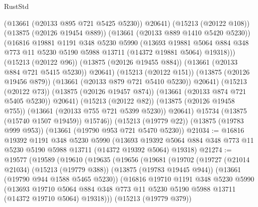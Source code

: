 \begin{lexlean}{RustStd}
\begin{coremodule}
                    (@13661 (@20133 @895 @721 @5425 @5230))
                    @20641)
                  (@15213 (@20122 @108))
                  (@13875 (@20126 @19454 @889))
                  (@13661 (@20133 @889 @1410 @5420 @5230))
                  (@16816
                    @19881
                    @1191
                    @348
                    @5230
                    @5990
                    (@13693
                      @19881
                      @5064
                      @884
                      @348
                      @773
                      @11
                      @5230
                      @5190
                      @5988
                      @13711
                      (@14372 @19881 @5064)
                      @19318)))
                (@15213 (@20122 @96))
                (@13875 (@20126 @19455 @884))
                (@13661 (@20133 @884 @721 @5415 @5230))
                @20641)
              (@15213 (@20122 @151))
              (@13875 (@20126 @19456 @879))
              (@13661 (@20133 @879 @721 @5410 @5230))
              @20641)
            (@15213 (@20122 @73))
            (@13875 (@20126 @19457 @874))
            (@13661 (@20133 @874 @721 @5405 @5230))
            @20641)
          (@15213 (@20122 @82))
          (@13875 (@20126 @19458 @755))
          (@13661 (@20133 @755 @721 @5399 @5230))
          @20641)
        @15734
        (@13875 (@15740 @1507 @19459))
        @15746))
    (@15213 (@19779 @22))
    (@13875 (@19783 @999 @953))
    (@13661 (@19790 @953 @721 @5470 @5230))
@21034 := @16816
    @19392
    @1191
    @348
    @5230
    @5990
    (@13693 @19392 @5064 @884 @348 @773 @11 @5230 @5190 @5988 @13711 (@14372 @19392 @5064) @19318)
@21274 := @19577
    (@19589
      (@19610
        (@19635
          (@19656
            (@19681
              (@19702
                (@19727
                  (@21014 @21034)
                  (@15213 (@19779 @388))
                  (@13875 (@19783 @19445 @944))
                  (@13661 (@19790 @944 @1588 @5465 @5230))
                  (@16816
                    @19710
                    @1191
                    @348
                    @5230
                    @5990
                    (@13693
                      @19710
                      @5064
                      @884
                      @348
                      @773
                      @11
                      @5230
                      @5190
                      @5988
                      @13711
                      (@14372 @19710 @5064)
                      @19318)))
                (@15213 (@19779 @379))

\end{coremodule}
\end{lexlean}
